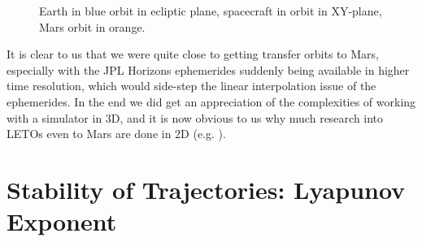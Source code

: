\begin{figure}[ht]
    \centering
    \hfill
    \hfill
    \caption{Earth in blue orbit in ecliptic plane, spacecraft in orbit in XY-plane, Mars orbit in orange.}
    \label{fig:r4b-sun-orbits}
\end{figure} 

It is clear to us that we were quite close to getting transfer orbits to Mars, especially with the JPL Horizons ephemerides suddenly being available in higher time resolution, which would side-step the linear interpolation issue of the ephemerides. In the end we did get an appreciation of the complexities of working with a simulator in 3D, and it is now obvious to us why much research into LETOs even to Mars are done in 2D (e.g. \cite{Topputo2014}).

\section{Stability of Trajectories: Lyapunov Exponent}
